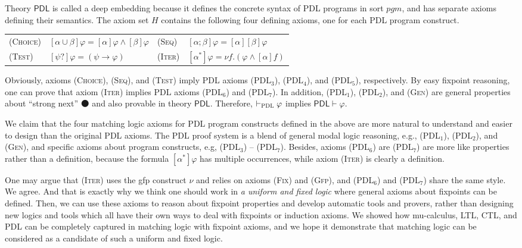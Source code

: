 \documentclass[acmsmall,review,anonymous]{acmart}
\newcommand{\imp}{\to}
\newcommand{\MLPDL}{\mathsf{PDL}}
\newcommand{\prule}[1]{\textsc{(#1)}}
\newcommand{\Gfp}{\prule{Gfp}\xspace}
\newcommand{\Fix}{\prule{Fix}\xspace}
\newcommand{\snext}{{\medbullet}}
\newcommand{\pgm}{\mathit{pgm}}
\newcommand{\PDL}{\textsc{PDL}}
\newcommand{\PDLseq}{\mathbin{;}}
\newcommand{\PDLunion}{\mathbin{\cup}}
\newcommand{\PDLstar}{^*}
\newcommand{\PDLquestion}{{?}}
\begin{document}
Theory $\MLPDL$ is called a deep embedding because
it defines the concrete syntax of PDL programs in sort $\pgm$,
and has separate axioms defining their semantics.
The axiom set $H$ contains the following four
defining axioms, one for each PDL program construct.
\begin{center}
\begin{tabular}{llll}
\prule{Choice} & $[\alpha \PDLunion \beta] \varphi = [\alpha] \varphi \wedge [\beta] \varphi$&
\prule{Seq} & $[\alpha \PDLseq \beta] \varphi = [\alpha][\beta]\varphi$
\\
\prule{Test} & $[\psi \PDLquestion] \varphi = (\psi \imp \varphi)$ &
\prule{Iter} & $[\alpha \PDLstar] \varphi = \nu f . (\varphi \wedge [\alpha] f)$
\end{tabular}
\end{center}

Obviously, axioms \prule{Choice}, \prule{Seq}, and \prule{Test}
imply PDL axioms \prule{PDL$_3$}, \prule{PDL$_4$}, and \prule{PDL$_5$}, respectively.
By easy fixpoint reasoning, one can prove that
axiom \prule{Iter} implies PDL axioms
\prule{PDL$_6$} and \prule{PDL$_7$}.
In addition, \prule{PDL$_1$}, \prule{PDL$_2$}, and \prule{Gen}
are general properties about ``strong next'' $\snext$ and also provable in theory $\MLPDL$.
Therefore, $\vdash_\PDL\varphi$ implies $\MLPDL \vdash \varphi$.

We claim that the four matching logic axioms for PDL program constructs defined in the above
are more natural to understand and easier to design than the original PDL axioms.
The PDL proof system is a blend of
general modal logic reasoning, e.g., \prule{PDL$_1$}, \prule{PDL$_2$}, and \prule{Gen},
and specific axioms about program constructs, e.g, \prule{PDL$_3$} -- \prule{PDL$_7$}.
Besides, axioms \prule{PDL$_6$} are \prule{PDL$_7$} are more like properties
rather than a definition, because
the formula $[\alpha \PDLstar] \varphi$ has multiple occurrences, while 
axiom \prule{Iter} is clearly a definition.

One may argue that \prule{Iter} uses the gfp construct $\nu$
and relies on axioms \Fix and \Gfp,
and \prule{PDL$_6$} and \prule{PDL$_7$} share the same style.
We agree.
And that is exactly why we think one should work in \emph{a uniform and fixed logic}
where general axioms about fixpoints can be defined.
Then, we can use these axioms to reason about fixpoint properties
and develop automatic tools and provers, rather than 
designing new logics and tools which all have their own ways to deal with fixpoints
or induction axioms.
We showed how mu-calculus, LTL, CTL, and PDL can be completely captured in matching logic
with fixpoint axioms, and we hope it demonstrate that matching logic can be considered
as a candidate of such a uniform and fixed logic.
\end{document}
